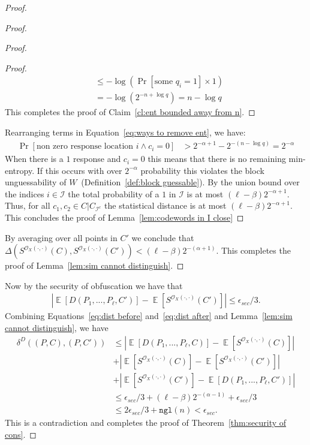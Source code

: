 \documentclass[11pt]{article}
\newcommand{\thref}[1]{\mbox{Theorem~\ref{#1}}}
\newcommand{\defref}[1]{\mbox{Definition~\ref{#1}}}
\newcommand{\lemref}[1]{\mbox{Lemma~\ref{#1}}}
\newcommand{\clref}[1]{\mbox{Claim~\ref{#1}}}
\DeclareMathOperator*{\expe}{\mathbb{E}}
\newcommand{\ngl}{\ensuremath{\mathtt{ngl}}\xspace}
\begin{document}
\begin{proof}
\begin{proof}
\begin{proof}
\begin{proof}
\begin{align*}
&\leq  -\log \left(\Pr[\text{some }q_i=1]\times 1\right)\\
&=-\log\left( 2^{-n+\log q} \right) = n-\log q
\end{align*}
This completes the proof of \clref{cl:ent bounded away from n}.
\end{proof}
\noindent
Rearranging terms in Equation~\ref{eq:ways to remove ent}, we have:
\begin{align*}
 \Pr[\text{non zero response location }i \wedge c_i=0] &>2^{-\alpha+1} - 2^{-(n-\log q)}=  2^{-\alpha}
 \end{align*}
 When there is a $1$ response and $c_i=0$ this means that there is no remaining min-entropy.  If this occurs with over $2^{-\alpha}$ probability this violates the block unguessability of $W$~(\defref{def:block guessable}).  By the union bound over the indices $i\in\mathcal{I}$ the total probability of a $1$ in $\mathcal{I}$ is at most $(\ell-\beta)2^{-\alpha+1}$. Thus, for all $c_1, c_2\in C| C_{\mathcal{I}^c}$ the statistical distance is at most $(\ell- \beta)2^{-\alpha+1}$.  This concludes the proof of \lemref{lem:codewords in I close}
\end{proof}
By averaging over all points in $C'$ we conclude that $\Delta(S^{\mathcal{O}_X(\cdot, \cdot)}(C), S^{\mathcal{O}_X(\cdot, \cdot)}(C')) < (\ell -\beta)2^{-(\alpha+1)}$.  This completes the proof of \lemref{lem:sim cannot distinguish}.
\end{proof}

\noindent Now by the security of obfuscation we have that
\begin{align}
\label{eq:dist after}
|\expe [D(P_1,..., P_\ell, C') ]- \expe [S^{\mathcal{O}_X(\cdot, \cdot)}(C')] |\leq \epsilon_{sec}/3.
\end{align}
Combining Equations~\ref{eq:dist before} and~\ref{eq:dist after} and \lemref{lem:sim cannot distinguish}, we have
\begin{align*}
\delta^{D}(( P, C), (P, C'))&\leq |\expe [D(P_1,..., P_\ell, C)] - \expe [S^{\mathcal{O}_X(\cdot, \cdot)}(C)]| \\
&+|\expe[S^{\mathcal{O}_X(\cdot, \cdot)}(C)] - \expe[S^{\mathcal{O}_X(\cdot, \cdot)}(C')] |\\
&+|\expe [S^{\mathcal{O}_X(\cdot, \cdot)}(C')] - \expe [D(P_1,..., P_\ell, C') ]|\\
&\leq \epsilon_{sec}/3+ (\ell-\beta)2^{-(\alpha-1)}+\epsilon_{sec}/3 \\
&\leq 2\epsilon_{sec}/3 + \ngl(n) < \epsilon_{sec}.
\end{align*}
This is a contradiction and completes the proof of \thref{thm:security of cons}.
\end{proof}
\end{document}
